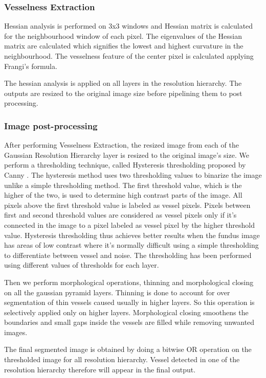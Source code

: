 \documentclass[conference]{IEEEtran}
\begin{document}
\subsubsection{Vesselness Extraction}
\label{sssec:vessel}

\par
Hessian analysis is performed on 3x3 windows and Hessian matrix is calculated for the neighbourhood window of each pixel. The eigenvalues of the Hessian matrix are calculated which signifies the lowest and highest curvature in the neighbourhood. The vesselness feature of the center pixel is calculated applying Frangi’s formula.
\par
The hessian analysis is applied on all layers in the resolution hierarchy. The outputs are resized to the original image size before pipelining them to post processing.

\subsubsection{Image post-processing}
\label{sssec:post}

\par
After performing Vesselness Extraction, the resized image from each of the Gaussian Resolution Hierarchy layer is resized to the original image’s size. We perform a thresholding technique, called Hysteresis thresholding proposed by Canny \cite{23}. The hysteresis method uses two thresholding values to binarize the image unlike a simple thresholding method. The first threshold value, which is the higher of the two, is used to determine high contrast parts of the image. All pixels above the first threshold value is labeled as vessel pixels. Pixels between first and second threshold values are considered as vessel pixels only if it’s connected in the image to a pixel labeled as vessel pixel by the higher threshold value. Hysteresis thresholding thus achieves better results when the fundus image has areas of low contrast where it’s normally difficult using a simple thresholding to differentiate between vessel and noise. The thresholding has been performed using different values of thresholds for each layer.
\par
Then we perform morphological operations, thinning and morphological closing on all the gaussian pyramid layers. Thinning is done to account for over segmentation of thin vessels caused usually in higher layers. So this operation is selectively applied only on higher layers. Morphological closing smoothens the boundaries and small gaps inside the vessels are filled while removing unwanted images.
\par
The final segmented image is obtained by doing a bitwise OR operation on the thresholded image for all resolution hierarchy. Vessel detected in one of the resolution hierarchy therefore will appear in the final output.
\end{document}
